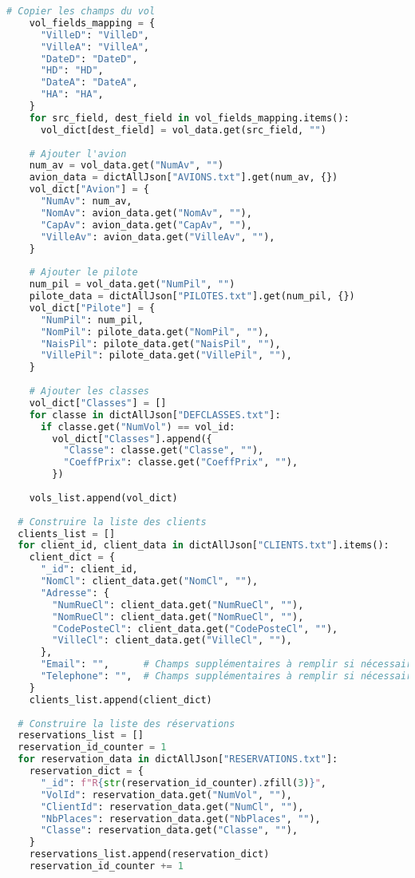 \begin{lstlisting}[language=Python, caption=Script de création des documents JSON, label=lst:code_json]
    # Copier les champs du vol
    vol_fields_mapping = {
      "VilleD": "VilleD",
      "VilleA": "VilleA",
      "DateD": "DateD",
      "HD": "HD",
      "DateA": "DateA",
      "HA": "HA",
    }
    for src_field, dest_field in vol_fields_mapping.items():
      vol_dict[dest_field] = vol_data.get(src_field, "")
  
    # Ajouter l'avion
    num_av = vol_data.get("NumAv", "")
    avion_data = dictAllJson["AVIONS.txt"].get(num_av, {})
    vol_dict["Avion"] = {
      "NumAv": num_av,
      "NomAv": avion_data.get("NomAv", ""),
      "CapAv": avion_data.get("CapAv", ""),
      "VilleAv": avion_data.get("VilleAv", ""),
    }
  
    # Ajouter le pilote
    num_pil = vol_data.get("NumPil", "")
    pilote_data = dictAllJson["PILOTES.txt"].get(num_pil, {})
    vol_dict["Pilote"] = {
      "NumPil": num_pil,
      "NomPil": pilote_data.get("NomPil", ""),
      "NaisPil": pilote_data.get("NaisPil", ""),
      "VillePil": pilote_data.get("VillePil", ""),
    }
  
    # Ajouter les classes
    vol_dict["Classes"] = []
    for classe in dictAllJson["DEFCLASSES.txt"]:
      if classe.get("NumVol") == vol_id:
        vol_dict["Classes"].append({
          "Classe": classe.get("Classe", ""),
          "CoeffPrix": classe.get("CoeffPrix", ""),
        })
  
    vols_list.append(vol_dict)
  
  # Construire la liste des clients
  clients_list = []
  for client_id, client_data in dictAllJson["CLIENTS.txt"].items():
    client_dict = {
      "_id": client_id,
      "NomCl": client_data.get("NomCl", ""),
      "Adresse": {
        "NumRueCl": client_data.get("NumRueCl", ""),
        "NomRueCl": client_data.get("NomRueCl", ""),
        "CodePosteCl": client_data.get("CodePosteCl", ""),
        "VilleCl": client_data.get("VilleCl", ""),
      },
      "Email": "",      # Champs supplémentaires à remplir si nécessaire
      "Telephone": "",  # Champs supplémentaires à remplir si nécessaire
    }
    clients_list.append(client_dict)
  
  # Construire la liste des réservations
  reservations_list = []
  reservation_id_counter = 1
  for reservation_data in dictAllJson["RESERVATIONS.txt"]:
    reservation_dict = {
      "_id": f"R{str(reservation_id_counter).zfill(3)}",
      "VolId": reservation_data.get("NumVol", ""),
      "ClientId": reservation_data.get("NumCl", ""),
      "NbPlaces": reservation_data.get("NbPlaces", ""),
      "Classe": reservation_data.get("Classe", ""),
    }
    reservations_list.append(reservation_dict)
    reservation_id_counter += 1
  

\end{lstlisting}
